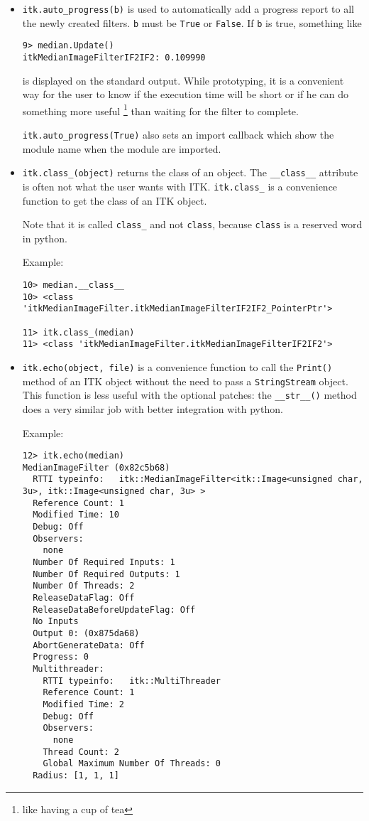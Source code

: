 \documentclass{InsightArticle}
\begin{document}
\begin{itemize}
  \item \verb$itk.auto_progress(b)$ is used to automatically add a progress report
to all the newly created filters. \verb$b$ must be \verb$True$ or \verb$False$. If
\verb$b$ is true, something like
\begin{verbatim}
9> median.Update()
itkMedianImageFilterIF2IF2: 0.109990
\end{verbatim}
is displayed on the standard output. 
While prototyping, it is a convenient way for the user to know if
the execution time will be short or if he can do something more useful
\footnote{like having a cup of tea} than waiting for the filter to complete.

\verb$itk.auto_progress(True)$ also sets an import callback which show the module name when
the module are imported.

  \item \verb$itk.class_(object)$ returns the class of an object. The \verb$__class__$
attribute is often not what the user wants with ITK. \verb$itk.class_$ is a convenience
function to get the class of an ITK object.

Note that it is called \verb$class_$ and not \verb$class$, because \verb$class$ is a
reserved word in python.

Example:
\begin{verbatim}
10> median.__class__
10> <class 'itkMedianImageFilter.itkMedianImageFilterIF2IF2_PointerPtr'>

11> itk.class_(median)
11> <class 'itkMedianImageFilter.itkMedianImageFilterIF2IF2'>
\end{verbatim}

  \item \verb$itk.echo(object, file)$ is a convenience function to call the \verb$Print()$
method of an ITK object without the need to pass a \verb$StringStream$ object.
This function is less useful with the optional patches: the \verb$__str__()$
method does a very similar job with better integration with python.

Example:

\begin{verbatim}
12> itk.echo(median)
MedianImageFilter (0x82c5b68)
  RTTI typeinfo:   itk::MedianImageFilter<itk::Image<unsigned char, 3u>, itk::Image<unsigned char, 3u> >
  Reference Count: 1
  Modified Time: 10
  Debug: Off
  Observers:
    none
  Number Of Required Inputs: 1
  Number Of Required Outputs: 1
  Number Of Threads: 2
  ReleaseDataFlag: Off
  ReleaseDataBeforeUpdateFlag: Off
  No Inputs
  Output 0: (0x875da68)
  AbortGenerateData: Off
  Progress: 0
  Multithreader:
    RTTI typeinfo:   itk::MultiThreader
    Reference Count: 1
    Modified Time: 2
    Debug: Off
    Observers:
      none
    Thread Count: 2
    Global Maximum Number Of Threads: 0
  Radius: [1, 1, 1]
\end{verbatim}



\end{itemize}
\end{document}
